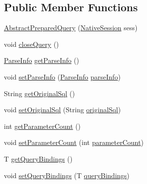 \subsection*{Public Member Functions}
\begin{DoxyCompactItemize}
\item 
\mbox{\hyperlink{classcom_1_1mysql_1_1cj_1_1_abstract_prepared_query_ae000602ddaa23a005e2c292a68e01378}{Abstract\+Prepared\+Query}} (\mbox{\hyperlink{classcom_1_1mysql_1_1cj_1_1_native_session}{Native\+Session}} sess)
\item 
void \mbox{\hyperlink{classcom_1_1mysql_1_1cj_1_1_abstract_prepared_query_a6bce42566c99020f4a260d78ffcc614f}{close\+Query}} ()
\item 
\mbox{\hyperlink{classcom_1_1mysql_1_1cj_1_1_parse_info}{Parse\+Info}} \mbox{\hyperlink{classcom_1_1mysql_1_1cj_1_1_abstract_prepared_query_a4dff15e2c2238c5bcc5b383306828163}{get\+Parse\+Info}} ()
\item 
void \mbox{\hyperlink{classcom_1_1mysql_1_1cj_1_1_abstract_prepared_query_ab00c6b67848f2ba9272305a8ace05603}{set\+Parse\+Info}} (\mbox{\hyperlink{classcom_1_1mysql_1_1cj_1_1_parse_info}{Parse\+Info}} \mbox{\hyperlink{classcom_1_1mysql_1_1cj_1_1_abstract_prepared_query_adc622ebab9af7699a66fbbae03c910f3}{parse\+Info}})
\item 
String \mbox{\hyperlink{classcom_1_1mysql_1_1cj_1_1_abstract_prepared_query_a91146df290c8444346a58138f507144e}{get\+Original\+Sql}} ()
\item 
void \mbox{\hyperlink{classcom_1_1mysql_1_1cj_1_1_abstract_prepared_query_a6693cafd9707204bb00fc796304b9fe6}{set\+Original\+Sql}} (String \mbox{\hyperlink{classcom_1_1mysql_1_1cj_1_1_abstract_prepared_query_a06bb5d3e19f687e01fb4274e1f6f4f6a}{original\+Sql}})
\item 
int \mbox{\hyperlink{classcom_1_1mysql_1_1cj_1_1_abstract_prepared_query_a34bab98739dae5cf2c464c66299cbfe5}{get\+Parameter\+Count}} ()
\item 
void \mbox{\hyperlink{classcom_1_1mysql_1_1cj_1_1_abstract_prepared_query_ae445403998e9873663766a404997e7dc}{set\+Parameter\+Count}} (int \mbox{\hyperlink{classcom_1_1mysql_1_1cj_1_1_abstract_prepared_query_a52a040d3c51f2a35b9c257edf897c6f0}{parameter\+Count}})
\item 
T \mbox{\hyperlink{classcom_1_1mysql_1_1cj_1_1_abstract_prepared_query_a6d47717b47234d5e702dddef5aa67698}{get\+Query\+Bindings}} ()
\item 
void \mbox{\hyperlink{classcom_1_1mysql_1_1cj_1_1_abstract_prepared_query_a2bdf26b02ecc539e9fcd06d34fcd8c9a}{set\+Query\+Bindings}} (T \mbox{\hyperlink{classcom_1_1mysql_1_1cj_1_1_abstract_prepared_query_a0d53ba1433f909085f14d0b1606faeca}{query\+Bindings}})

\end{DoxyCompactItemize}
